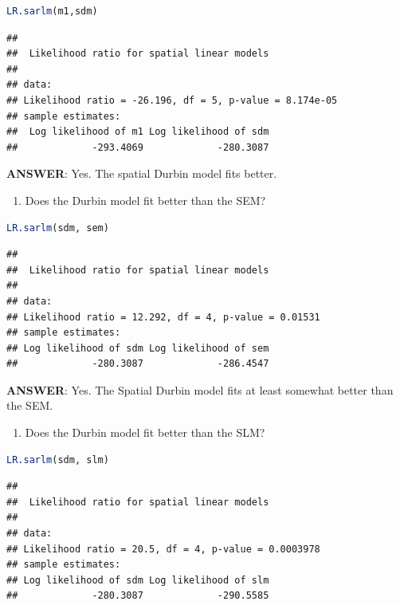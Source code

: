 \documentclass[
]{book}
\providecommand{\tightlist}{%
  \setlength{\itemsep}{0pt}\setlength{\parskip}{0pt}}
\begin{document}
\begin{lstlisting}[language=R]
LR.sarlm(m1,sdm)
\end{lstlisting}

\begin{lstlisting}
## 
## 	Likelihood ratio for spatial linear models
## 
## data:  
## Likelihood ratio = -26.196, df = 5, p-value = 8.174e-05
## sample estimates:
##  Log likelihood of m1 Log likelihood of sdm 
##             -293.4069             -280.3087
\end{lstlisting}

\textbf{ANSWER}: Yes. The spatial Durbin model fits better.

\begin{enumerate}
\def\labelenumi{\arabic{enumi}.}
\setcounter{enumi}{1}
\tightlist
\item
  Does the Durbin model fit better than the SEM?
\end{enumerate}

\begin{lstlisting}[language=R]
LR.sarlm(sdm, sem)
\end{lstlisting}

\begin{lstlisting}
## 
## 	Likelihood ratio for spatial linear models
## 
## data:  
## Likelihood ratio = 12.292, df = 4, p-value = 0.01531
## sample estimates:
## Log likelihood of sdm Log likelihood of sem 
##             -280.3087             -286.4547
\end{lstlisting}

\textbf{ANSWER}: Yes. The Spatial Durbin model fits at least somewhat better than the SEM.

\begin{enumerate}
\def\labelenumi{\arabic{enumi}.}
\setcounter{enumi}{2}
\tightlist
\item
  Does the Durbin model fit better than the SLM?
\end{enumerate}

\begin{lstlisting}[language=R]
LR.sarlm(sdm, slm)
\end{lstlisting}

\begin{lstlisting}
## 
## 	Likelihood ratio for spatial linear models
## 
## data:  
## Likelihood ratio = 20.5, df = 4, p-value = 0.0003978
## sample estimates:
## Log likelihood of sdm Log likelihood of slm 
##             -280.3087             -290.5585
\end{lstlisting}
\end{document}
